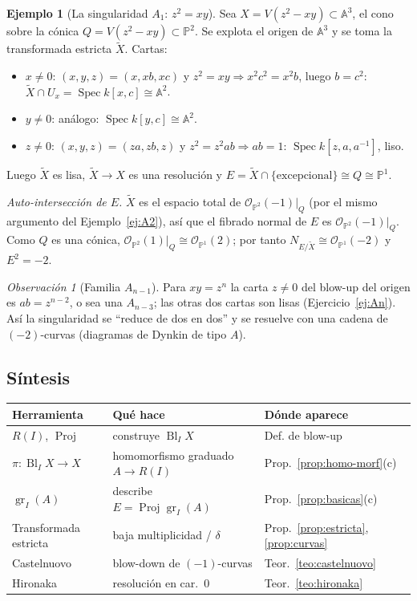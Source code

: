 \documentclass[11pt,a4paper]{article}
\newcommand{\Spec}{\operatorname{Spec}}
\newcommand{\Proj}{\operatorname{Proj}}
\newcommand{\Bl}{\operatorname{Bl}}
\newcommand{\gr}{\operatorname{gr}}
\newcommand{\A}{\mathbb{A}}
\newcommand{\PP}{\mathbb{P}}
\newcommand{\cO}{\mathcal{O}}
\theoremstyle{plain}
\theoremstyle{definition}
\newtheorem{ejemplo}[teorema]{Ejemplo}
\theoremstyle{remark}
\newtheorem{observacion}[teorema]{Observación}
\begin{document}
\begin{ejemplo}[La singularidad $A_1$: $z^2=xy$]\label{ej:A1}
Sea $X=V(z^2-xy)\subset\A^3$, el cono sobre la cónica $Q=V(z^2-xy)\subset\PP^2$. Se explota el origen de $\A^3$ y se toma la transformada estricta $\tilde X$. Cartas:
\begin{itemize}
\item $x\ne0$: $(x,y,z)=(x,xb,xc)$ y $z^2=xy\Rightarrow x^2c^2=x^2b$, luego $b=c^2$: $\tilde X\cap U_x=\Spec k[x,c]\cong\A^2$.
\item $y\neq0$: análogo: $\Spec k[y,c]\cong\A^2$.
\item $z\ne0$: $(x,y,z)=(za,zb,z)$ y $z^2=z^2ab\Rightarrow ab=1$: $\Spec k[z,a,a^{-1}]$, liso.
\end{itemize}
Luego $\tilde X$ es lisa, $\tilde X\to X$ es una resolución y $E=\tilde X\cap\{\text{excepcional}\}\cong Q\cong\PP^1$.

\emph{Auto-intersección de $E$.} $\tilde X$ es el espacio total de $\cO_{\PP^2}(-1)|_Q$ (por el mismo argumento del Ejemplo~\ref{ej:A2}), así que el fibrado normal de $E$ es $\cO_{\PP^2}(-1)|_Q$. Como $Q$ es una cónica, $\cO_{\PP^2}(1)|_Q\cong\cO_{\PP^1}(2)$; por tanto $N_{E/\tilde X}\cong\cO_{\PP^1}(-2)$ y $E^2=-2$.
\end{ejemplo}

\begin{observacion}[Familia $A_{n-1}$]
Para $xy=z^n$ la carta $z\ne0$ del blow-up del origen es $ab=z^{n-2}$, o sea una $A_{n-3}$; las otras dos cartas son lisas (Ejercicio~\ref{ej:An}). Así la singularidad se ``reduce de dos en dos'' y se resuelve con una cadena de $(-2)$-curvas (diagramas de Dynkin de tipo $A$).
\end{observacion}

\subsection*{Síntesis}
\begin{center}
\begin{tabular}{@{}lll@{}}
\toprule
Herramienta & Qué hace & Dónde aparece \\
\midrule
$R(I)$, $\Proj$ & construye $\Bl_IX$ & Def. de blow-up \\
$\pi\colon\Bl_IX\to X$ & homomorfismo graduado $A\to R(I)$ & Prop.~\ref{prop:homo-morf}(c) \\
$\gr_I(A)$ & describe $E=\Proj\gr_I(A)$ & Prop.~\ref{prop:basicas}(c) \\
Transformada estricta & baja multiplicidad / $\delta$ & Prop.~\ref{prop:estricta}, \ref{prop:curvas} \\
Castelnuovo & blow-down de $(-1)$-curvas & Teor.~\ref{teo:castelnuovo} \\
Hironaka & resolución en car.\ $0$ & Teor.~\ref{teo:hironaka} \\
\bottomrule
\end{tabular}
\end{center}
\end{document}
